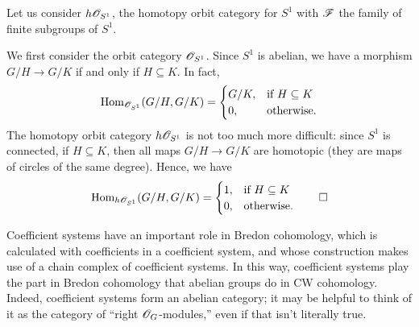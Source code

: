 \begin{exm}
Let us consider $h\mathscr O_{S^1}$, the homotopy orbit category for $S^1$ with $\mathscr F$ the family of finite subgroups of
$S^1$.

We first consider the orbit category $\mathscr O_{S^1}$. Since $S^1$ is abelian, we have a morphism $G/H \to G/K$
if and only if $H \subseteq K$. In fact,
	\[\operatorname{Hom}_{\mathscr O_{S^1}}(G/H, G/K) =
	\begin{cases}
	G/K, &\text{if }H \subseteq K\\
	0, &\text{otherwise.}
	\end{cases}\]
The homotopy orbit category $h\mathscr O_{S^1}$ is not too much more difficult: since $S^1$ is connected, if $H \subseteq
K$, then all maps $G/H \to G/K$ are homotopic (they are maps of circles of the same degree). Hence, we have
	\[\operatorname{Hom}_{h\mathscr O_{S^1}}(G/H, G/K) = \begin{cases}
	1, &\text{if } H \subseteq K\\
	0, &\text{otherwise.}
	\end{cases} \qedhere\]
\end{exm}
Coefficient systems have an important role in Bredon cohomology, which is calculated with coefficients in a
coefficient system, and whose construction makes use of a chain complex of coefficient systems. In this way,
coefficient systems play the part in Bredon cohomology that abelian groups do in CW cohomology. Indeed, coefficient
systems form an abelian category; it may be helpful to think of it as the category of ``right $\mathscr O_G$-modules,''
even if that isn't literally true.

